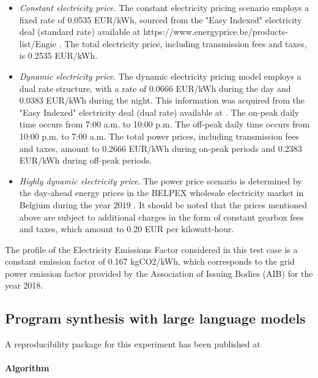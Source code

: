 \begin{itemize}
    \item \emph{Constant electricity price}. The constant electricity pricing scenario employs a fixed rate of 0.0535 EUR/kWh, sourced from the "Easy Indexed" electricity deal (standard rate) available at https://www.energyprice.be/products-list/Engie \cite{Engie}.  The total electricity price, including transmission fees and taxes, is 0.2535 EUR/kWh.
    \item \emph{Dynamic electricity price}. The dynamic electricity pricing model employs a dual rate structure, with a rate of 0.0666 EUR/kWh during the day and 0.0383 EUR/kWh during the night. This information was acquired from the "Easy Indexed" electricity deal (dual rate) available at \cite{Engie}.   The on-peak daily time occurs from 7:00 a.m. to 10:00 p.m.   The off-peak daily time occurs from 10:00 p.m. to 7:00 a.m.  The total power prices, including transmission fees and taxes, amount to 0.2666 EUR/kWh during on-peak periods and 0.2383 EUR/kWh during off-peak periods.
    \item \emph{Highly dynamic electricity price}. The power price scenario is determined by the day-ahead energy prices in the BELPEX wholesale electricity market in Belgium during the year 2019 \cite{Elexys}.  It should be noted that the prices mentioned above are subject to additional charges in the form of constant gearbox fees and taxes, which amount to 0.20 EUR per kilowatt-hour.
\end{itemize} 
The profile of the Electricity Emissions Factor considered in this test case is a constant emission factor of 0.167 kgCO2/kWh, which corresponds to the grid power emission factor provided by the Association of Issuing Bodies (AIB) for the year 2018. 

\newpage
\subsection{Program synthesis with large language models}
\label{sec:boptest-ProgramSynthesis}

\begin{remark}
  A reproducibility package for this experiment has been published at \cite{vadimGPTcoder}
\end{remark}

\paragraph{Algorithm}


